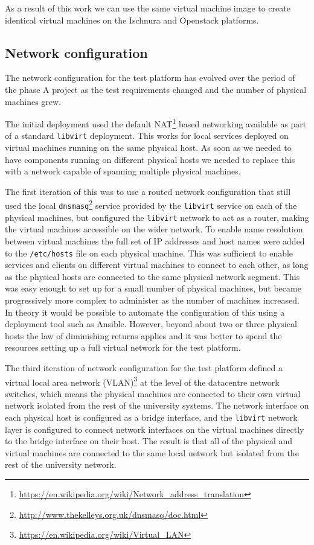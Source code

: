 \documentclass{article}
\newcommand{\ansible} {Ansible\xspace}
\newcommand{\openstack} {Openstack\xspace}
\newcommand{\dnsmasq} {\texttt{dnsmasq}\xspace}
\newcommand{\ischnura} {Ischnura\xspace}
\newcommand{\libvirt} {\texttt{libvirt}\xspace}
\newcommand{\datacentre} {datacentre\xspace}
\newcommand{\vlan} {VLAN\xspace}
\newcommand{\phasea} {phase A\xspace}
\newcommand{\testplatform} {test platform\xspace}
\newcommand{\footurl}[1] {\footnote{\url{#1}}}
\begin{document}
As a result of this work we can use the same virtual machine image to create identical virtual machines on the \ischnura and \openstack platforms.

\subsection{Network configuration}
\label{deployment-testbed.network-layers}

The network configuration for the \testplatform has evolved over the period of the \phasea project as the test requirements changed and the number of physical machines grew. 

The initial deployment used the default NAT\footurl{https://en.wikipedia.org/wiki/Network_address_translation} based networking available as part of a standard \libvirt deployment. This works for local services deployed on virtual machines running on the same physical host. As soon as we needed to have components running on different physical hosts we needed to replace this with a network capable of spanning multiple physical machines.

The first iteration of this was to use a routed network configuration that still used the local \dnsmasq\footurl{http://www.thekelleys.org.uk/dnsmasq/doc.html} service provided by the \libvirt service on each of the physical machines, but configured the \libvirt network to act as a router, making the virtual machines accessible on the wider network.
To enable name resolution between virtual machines the full set of IP addresses and host names were added to the \texttt{/etc/hosts} file on each physical machine.
This was sufficient to enable services and clients on different virtual machines to connect to each other, as long as the physical hosts are connected to the same physical network segment.
This was easy enough to set up for a small number of physical machines, but became progressively more complex to administer as the number of machines increased.
In theory it would be possible to automate the configuration of this using a deployment tool such as \ansible. However, beyond about two or three physical hosts the law of diminishing returns applies and it was better to spend the resources setting up a full virtual network for the \testplatform.

The third iteration of network configuration for the \testplatform defined a virtual local area network (\vlan)\footurl{https://en.wikipedia.org/wiki/Virtual_LAN} at the level of the \datacentre network switches, which means the physical machines are connected to their own virtual network isolated from the rest of the university systems. The network interface on each physical host is configured as a bridge interface, and the \libvirt network layer is configured to connect network interfaces on the virtual machines directly to the bridge interface on their host. The result is that all of the physical and virtual machines are connected to the same local network but isolated from the rest of the university network.
\end{document}
